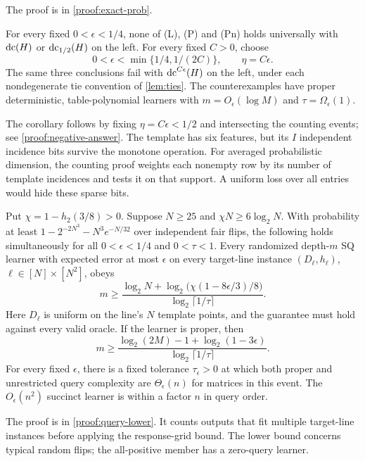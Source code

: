 \noindent The proof is in \cref{proof:exact-prob}.
\begin{corollary}\label{cor:negative-answer}
For every fixed $0<\epsilon<1/4$, none of (L), (P) and (Pn) holds universally with $\operatorname{dc}(H)$ or $\operatorname{dc}_{1/2}(H)$ on the left. For every fixed $C>0$, choose
\[
 0<\epsilon<\min\{1/4,1/(2C)\},\qquad\eta=C\epsilon.
\]
The same three conclusions fail with $\operatorname{dc}^{C\epsilon}(H)$ on the left, under each nondegenerate tie convention of \cref{lem:ties}. The counterexamples have proper deterministic, table-polynomial learners with $m=O_\epsilon(\log M)$ and $\tau=\Omega_\epsilon(1)$.
\end{corollary}

\noindent The corollary follows by fixing $\eta=C\epsilon<1/2$ and intersecting the counting events; see \cref{proof:negative-answer}. The template has six features, but its $I$ independent incidence bits survive the monotone operation. For averaged probabilistic dimension, the counting proof weights each nonempty row by its number of template incidences and tests it on that support. A uniform loss over all entries would hide these sparse bits.

\begin{theorem}\label{thm:query-lower}
Put $\chi=1-h_2(3/8)>0$. Suppose $N\ge25$ and $\chi N\ge6\log_2N$. With probability at least $1-2^{-2N^3}-N^3e^{-N/32}$ over independent fair flips, the following holds simultaneously for all $0<\epsilon<1/4$ and $0<\tau<1$. Every randomized depth-$m$ SQ learner with expected error at most $\epsilon$ on every target-line instance $(D_\ell,h_\ell)$, $\ell\in[N]\times[N^2]$, obeys
\[
 m\ge\frac{\log_2N+\log_2\!\bigl(\chi(1-8\epsilon/3)/8\bigr)}
 {\log_2\lceil1/\tau\rceil}.
\]
Here $D_\ell$ is uniform on the line's $N$ template points, and the guarantee must hold against every valid oracle. If the learner is proper, then
\[
 m\ge\frac{\log_2(2M)-1+\log_2(1-3\epsilon)}
 {\log_2\lceil1/\tau\rceil}.
\]
For every fixed $\epsilon$, there is a fixed tolerance $\tau_\epsilon>0$ at which both proper and unrestricted query complexity are $\Theta_\epsilon(n)$ for matrices in this event. The $O_\epsilon(n^2)$ succinct learner is within a factor $n$ in query order.
\end{theorem}
\noindent The proof is in \cref{proof:query-lower}. It counts outputs that fit multiple target-line instances before applying the response-grid bound. The lower bound concerns typical random flips; the all-positive member has a zero-query learner.
